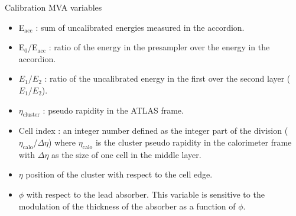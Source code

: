 \begin{frame}{Calibration MVA variables}
  \begin{itemize}
  \item E\(_{\text{acc}}\) : sum of uncalibrated energies measured in the accordion.
  \item E\(_{\text{0}}\)/E\(_{\text{acc}}\) : ratio of the energy in the presampler over the energy in the accordion.
  \item $E_1/E_2$ : ratio of the uncalibrated energy in the first over the second layer ($E_1/E_2$).
  \item \(\eta_{\text{cluster}}\) :  pseudo rapidity in the ATLAS frame.
  \item Cell index : an integer number defined as the integer part of the division ( \(\eta_{\text{calo}}\)/\(\Delta \eta\)) where \(\eta_{\text{calo}}\) is the cluster pseudo rapidity in the calorimeter frame with \(\Delta \eta\) as the size of one cell in the middle layer. 
  \item $\eta$ position of the cluster with respect to the cell edge.
  \item $\phi$ with respect to the lead absorber. This variable is sensitive to the modulation of the thickness of the absorber as a function of $\phi$.
  \end{itemize}
\end{frame}

